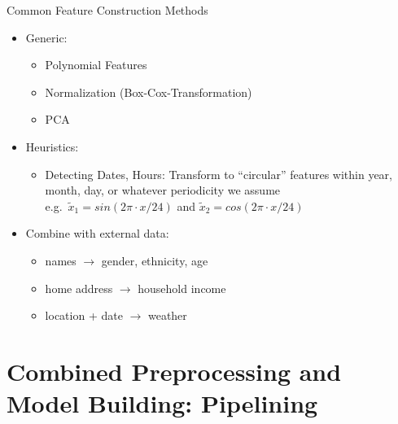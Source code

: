 \begin{frame}{Common Feature Construction Methods}
  \begin{itemize}
    \item Generic:
    \begin{itemize}
      \item Polynomial Features
      \item Normalization (Box-Cox-Transformation)
      \item PCA
    \end{itemize}
    \item Heuristics:
    \begin{itemize}
      \item Detecting Dates, Hours: Transform to ``circular'' features within year, month, day, or whatever periodicity we assume \\
      e.g.\ $\tilde x_1 = sin(2\pi \cdot x /24)$ and $\tilde x_2 = cos(2\pi \cdot x /24)$
    \end{itemize}
    \item Combine with external data:
    \begin{itemize}
      \item names $\rightarrow$ gender, ethnicity, age
      \item home address $\rightarrow$ household income
      \item location + date $\rightarrow$ weather
    \end{itemize}
  \end{itemize}
    
\end{frame}

\section{Combined Preprocessing and Model Building: Pipelining}

